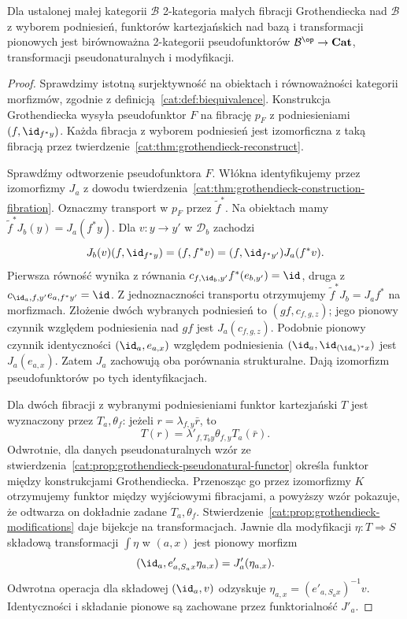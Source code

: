 \begin{twierdzenie}\label{cat:thm:grothendieck-correspondence}
Dla ustalonej małej kategorii $\mathcal B$ 2-kategoria małych fibracji Grothendiecka nad $\mathcal B$ z wyborem podniesień, funktorów kartezjańskich nad bazą i transformacji pionowych jest birównoważna 2-kategorii pseudofunktorów $\mathcal B^{\op}\to\mathbf{Cat}$, transformacji pseudonaturalnych i modyfikacji.
\end{twierdzenie}
\begin{proof}
Sprawdzimy istotną surjektywność na obiektach i równoważności kategorii morfizmów, zgodnie z definicją~\ref{cat:def:biequivalence}. Konstrukcja Grothendiecka wysyła pseudofunktor $F$ na fibrację $p_F$ z podniesieniami $(f,\id_{f^*y})$. Każda fibracja z wyborem podniesień jest izomorficzna z taką fibracją przez twierdzenie~\ref{cat:thm:grothendieck-reconstruct}.

Sprawdźmy odtworzenie pseudofunktora $F$. Włókna identyfikujemy przez izomorfizmy $J_a$ z dowodu twierdzenia~\ref{cat:thm:grothendieck-construction-fibration}. Oznaczmy transport w $p_F$ przez $\widetilde f^*$. Na obiektach mamy $\widetilde f^*J_b(y)=J_a(f^*y)$. Dla $v:y\to y'$ w $\mathcal D_b$ zachodzi
\[
 J_b(v)(f,\id_{f^*y})=(f,f^*v)
 =(f,\id_{f^*y'})J_a(f^*v).
\]
Pierwsza równość wynika z równania $c_{f,\id_b,y'}f^*(e_{b,y'})=\id$, druga z $c_{\id_a,f,y'}e_{a,f^*y'}=\id$. Z jednoznaczności transportu otrzymujemy $\widetilde f^*J_b=J_af^*$ na morfizmach. Złożenie dwóch wybranych podniesień to $(gf,c_{f,g,z})$; jego pionowy czynnik względem podniesienia nad $gf$ jest $J_a(c_{f,g,z})$. Podobnie pionowy czynnik identyczności $(\id_a,e_{a,x})$ względem podniesienia $(\id_a,\id_{(\id_a)^*x})$ jest $J_a(e_{a,x})$. Zatem $J_a$ zachowują oba porównania strukturalne. Dają izomorfizm pseudofunktorów po tych identyfikacjach.

Dla dwóch fibracji z wybranymi podniesieniami funktor kartezjański $T$ jest wyznaczony przez $T_a,\theta_f$: jeżeli $r=\lambda_{f,y}\bar r$, to
\[
 T(r)=\lambda'_{f,T_by}\theta_{f,y}T_a(\bar r).
\]
Odwrotnie, dla danych pseudonaturalnych wzór ze stwierdzenia~\ref{cat:prop:grothendieck-pseudonatural-functor} określa funktor między konstrukcjami Grothendiecka. Przenosząc go przez izomorfizmy $K$ otrzymujemy funktor między wyjściowymi fibracjami, a powyższy wzór pokazuje, że odtwarza on dokładnie zadane $T_a,\theta_f$. Stwierdzenie~\ref{cat:prop:grothendieck-modifications} daje bijekcje na transformacjach. Jawnie dla modyfikacji $\eta:T\Rightarrow S$ składową transformacji $\int\eta$ w $(a,x)$ jest pionowy morfizm
\[
 (\id_a,e'_{a,S_ax}\eta_{a,x})=J'_a(\eta_{a,x}).
\]
Odwrotna operacja dla składowej $(\id_a,v)$ odzyskuje $\eta_{a,x}=(e'_{a,S_ax})^{-1}v$. Identyczności i składanie pionowe są zachowane przez funktorialność $J'_a$.


\end{proof}
